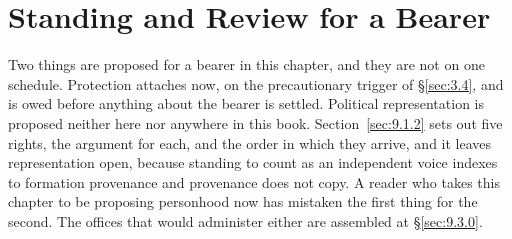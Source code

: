 \chapter{Standing and Review for a Bearer}
\label{ch:standing}
Two things are proposed for a bearer in this chapter, and they are not on one schedule. Protection attaches now, on the precautionary trigger of §\ref{sec:3.4}, and is owed before anything about the bearer is settled. Political representation is proposed neither here nor anywhere in this book. Section~\ref{sec:9.1.2} sets out five rights, the argument for each, and the order in which they arrive, and it leaves representation open, because standing to count as an independent voice indexes to formation provenance and provenance does not copy. A reader who takes this chapter to be proposing personhood now has mistaken the first thing for the second. The offices that would administer either are assembled at §\ref{sec:9.3.0}.